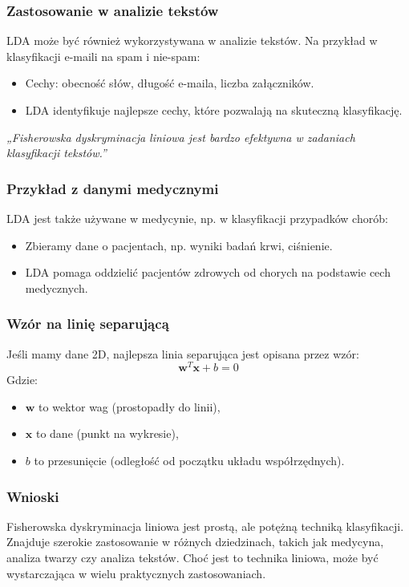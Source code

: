 \documentclass{beamer}
\begin{document}
\begin{frame}
    \frametitle{Zastosowanie w analizie tekstów}
    LDA może być również wykorzystywana w analizie tekstów. Na przykład w klasyfikacji e-maili na spam i nie-spam:
    \begin{itemize}
        \item Cechy: obecność słów, długość e-maila, liczba załączników.
        \item LDA identyfikuje najlepsze cechy, które pozwalają na skuteczną klasyfikację.
    \end{itemize}
    \textit{„Fisherowska dyskryminacja liniowa jest bardzo efektywna w zadaniach klasyfikacji tekstów.”}
\end{frame}

\begin{frame}
    \frametitle{Przykład z danymi medycznymi}
    LDA jest także używane w medycynie, np. w klasyfikacji przypadków chorób:
    \begin{itemize}
        \item Zbieramy dane o pacjentach, np. wyniki badań krwi, ciśnienie.
        \item LDA pomaga oddzielić pacjentów zdrowych od chorych na podstawie cech medycznych.
    \end{itemize}
\end{frame}

\begin{frame}
    \frametitle{Wzór na linię separującą}
    Jeśli mamy dane 2D, najlepsza linia separująca jest opisana przez wzór:
    \[
    \mathbf{w}^T \mathbf{x} + b = 0
    \]
    Gdzie:
    \begin{itemize}
        \item \( \mathbf{w} \) to wektor wag (prostopadły do linii),
        \item \( \mathbf{x} \) to dane (punkt na wykresie),
        \item \( b \) to przesunięcie (odległość od początku układu współrzędnych).
    \end{itemize}
\end{frame}

\begin{frame}
    \frametitle{Wnioski}
    Fisherowska dyskryminacja liniowa jest prostą, ale potężną techniką klasyfikacji. Znajduje szerokie zastosowanie w różnych dziedzinach, takich jak medycyna, analiza twarzy czy analiza tekstów. Choć jest to technika liniowa, może być wystarczająca w wielu praktycznych zastosowaniach.
\end{frame}
\end{document}

